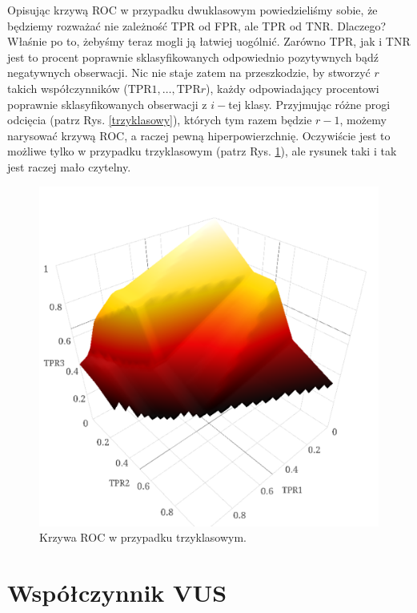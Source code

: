 \documentclass{mini}
\begin{document}
Opisując krzywą ROC w przypadku dwuklasowym powiedzieliśmy sobie, że będziemy rozważać nie zależność TPR od FPR, ale TPR od TNR. Dlaczego? Właśnie po to, żebyśmy teraz mogli ją łatwiej uogólnić. Zarówno TPR, jak i TNR jest to procent poprawnie sklasyfikowanych odpowiednio pozytywnych bądź negatywnych obserwacji. Nic nie staje zatem na przeszkodzie, by stworzyć $r$ takich współczynników ($\text{TPR}1, \ldots, \text{TPR}r$), każdy odpowiadający procentowi poprawnie sklasyfikowanych obserwacji z $i-$tej klasy. Przyjmując różne progi odcięcia (patrz Rys. \ref{trzyklasowy}), których tym razem będzie $r-1$, możemy narysować krzywą ROC, a raczej pewną hiperpowierzchnię. Oczywiście jest to możliwe tylko w przypadku trzyklasowym (patrz Rys. \ref{3d}), ale rysunek taki i tak jest raczej mało czytelny. 

\begin{figure}[h]
\begin{center}
\includegraphics[scale=0.5]{roc3d.png}
\end{center}
\caption{Krzywa ROC w przypadku trzyklasowym.}
\label{3d}
\end{figure}

\section{Współczynnik VUS}
\end{document}
